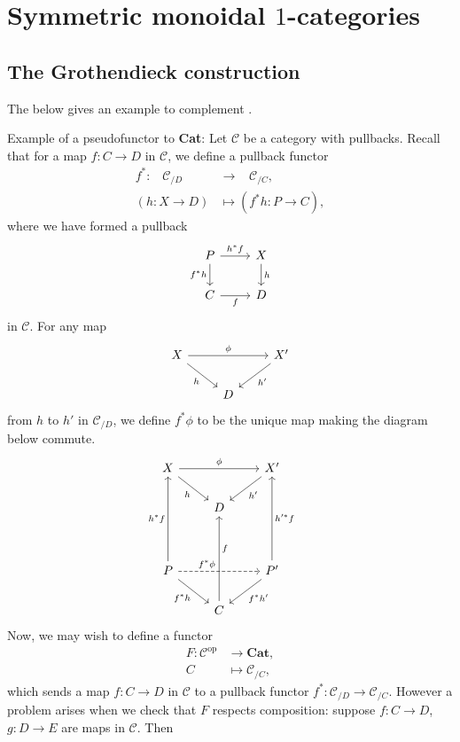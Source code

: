 \documentclass{MetricNotes2023}
\begin{document}
\section{Symmetric monoidal \(1\)-categories}

\subsection{The Grothendieck construction}

The below gives an example to complement \autocite{symmetricmonoidal}.

Example of a pseudofunctor to \textbf{Cat}: Let \(\mathcal{C}\) be a category with pullbacks. Recall that for a map \(f : C \to D\) in \(\mathcal{C}\), we define a pullback functor 
\begin{align*}
f^* : \;\;\;\mathcal{C}_{/D}\;\;\;&\to\;\;\; \mathcal{C}_{/C},\\
(h : X \to D) &\mapsto (f^*h : P \to C),
\end{align*}
 where we have formed a pullback 
\[\begin{tikzcd}
P \arrow[r, "h^*f"] \arrow[d, swap, "f^*h"]  & X \arrow[d, "h"]  \\
C \arrow[r, swap, "f"]  & D
\end{tikzcd}\]
in \(\mathscr{C}\). For any map 
\[\begin{tikzcd}
X \arrow[rr, "\phi"] \arrow[dr, swap, "h"]  & & X' \arrow[dl, "h'"]  \\
& D  & 
\end{tikzcd}\]
from \(h\) to \(h'\) in \(\mathcal{C}_{/D}\), we define \(f^*\phi\) to be the unique map making the diagram below commute.
\[\begin{tikzcd}
X \arrow[rr, "\phi"] \arrow[dr, swap, "h"]  & & X' \arrow[dl, "h'"]  \\
& D  & \\
& & & \\
P \arrow[rr, dashrightarrow, "f^*\phi" {xshift=-10pt}] \arrow[uuu, "h^*f"] \arrow[dr, swap, "f^*h"] & & P' \arrow[uuu, swap, "h'^*f"] \arrow[dl, "f^*h'"]\\
& C \arrow[uuu, swap, "f" {yshift=8pt}] & 
\end{tikzcd}\]
Now, we may wish to define a functor 
\begin{align*}
F : \mathcal{C}^{\text{op}} &\to \textbf{Cat},\\
C &\mapsto \mathcal{C}_{/C},
\end{align*}
which sends a map \(f : C \to D\) in \(\mathcal{C}\) to a pullback functor \(f^* : \mathcal{C}_{/D}\to \mathcal{C}_{/C}\). However a problem arises when we check that \(F\) respects composition: suppose \(f : C \to D\), \(g : D \to E\) are maps in \(\mathcal{C}\). Then 
\end{document}
